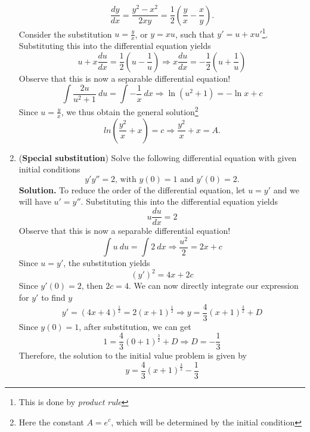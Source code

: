 \documentclass{article}
\begin{document}
\begin{enumerate}
    \begin{equation*}
        \frac{dy}{dx}=\frac{y^2-x^2}{2xy}=\frac{1}{2}(\frac{y}{x}-\frac{x}{y}).
    \end{equation*}
    Consider the substitution $u=\frac{y}{x}$, or $y=xu$, such that $y'=u+xu'$\footnote{This is done by \textit{product rule}}. Substituting this into the differential equation yields
    \begin{equation*}
        u+x\frac{du}{dx}=\frac{1}{2}(u-\frac{1}{u})\Rightarrow x\frac{du}{dx}=-\frac{1}{2}(u+\frac{1}{u})
    \end{equation*}
    Observe that this is now a separable differential equation!
    \begin{equation*}
        \int\frac{2u}{u^2+1}~du=\int-\frac{1}{x}~dx\Rightarrow \ln(u^2+1)=-\ln x+c
    \end{equation*}
    Since $u=\frac{y}{x}$, we thus obtain the general solution\footnote{Here the constant $A=e^c$, which will be determined by the initial condition}
    \begin{equation*}
        ln(\frac{y^2}{x}+x)=c\Rightarrow\frac{y^2}{x}+x=A.
    \end{equation*}
    \item (\textbf{Special substitution}) Solve the following differential equation with given initial conditions
    \begin{equation}
        y'y''=2\text{, with }y(0)=1\text{ and }y'(0)=2.
    \end{equation}
    \textbf{Solution.} To reduce the order of the differential equation, let $u=y'$ and we will have $u'=y''$. Substituting this into the differential equation yields
    \begin{equation*}
        u\frac{du}{dx}=2
    \end{equation*}
    Observe that this is now a separable differential equation!
    \begin{equation*}
        \int u~du=\int 2~dx \Rightarrow \frac{u^2}{2}=2x+c
    \end{equation*}
    Since $u=y'$, the substitution yields
    \begin{equation*}
        (y')^2=4x+2c
    \end{equation*}
    Since $y'(0)=2$, then $2c=4$. We can now directly integrate our expression for $y'$ to find $y$
    \begin{equation*}
        y'=(4x+4)^{\frac{1}{2}}=2(x+1)^{\frac{1}{2}}\Rightarrow y=\frac{4}{3}(x+1)^{\frac{3}{2}}+D
    \end{equation*}
    Since $y(0)=1$, after substitution, we can get
    \begin{equation*}
        1=\frac{4}{3}(0+1)^{\frac{3}{2}}+D\Rightarrow D=-\frac{1}{3}
    \end{equation*}
    Therefore, the solution to the initial value problem is given by
    \begin{equation*}
        y=\frac{4}{3}(x+1)^{\frac{3}{2}}-\frac{1}{3}
    \end{equation*}
\end{enumerate}
\end{document}
